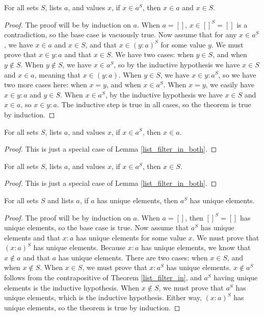 \documentclass[../../math.tex]{subfiles}
\begin{document}
\begin{lemma} \label{list_filter_in_both}
    For all sets $S$, lists $a$, and values $x$, if $x \in a^S$, then $x \in a$
    and $x \in S$.
\end{lemma}
\begin{proof}
    The proof will be by induction on $a$.  When $a = []$, $x \in []^S = []$ is
    a contradiction, so the base case is vacuously true.  Now assume that for
    any $x \in a^S$, we have $x \in a$ and $x \in S$, and that $x \in (y : a)^S$ for some
    value $y$.  We must prove that $x \in y : a$ and that $x \in S$.  We have two cases: when $y
    \in S$, and when $y \notin S$.  When $y \notin S$, we have $x \in a^S$, so
    by the inductive hypothesis we have $x \in S$ and $x \in a$, meaning that $x
    \in (y : a)$.  When $y \in S$, we have $x \in y : a^S$, so we have two more
    cases here: when $x = y$, and when $x \in a^S$.  When $x = y$, we easily
    have $x \in y : a$ and $y \in S$.  When $x \in a^S$, by the inductive
    hypothesis we have $x \in S$ and $x \in a$, so $x \in y : a$.  The inductive
    step is true in all cases, so the theorem is true by induction.
\end{proof}

\begin{theorem} \label{list_filter_in}
    For all sets $S$, lists $a$, and values $x$, if $x \in a^S$, then $x \in a$.
\end{theorem}
\begin{proof}
    This is just a special case of Lemma \ref{list_filter_in_both}.
\end{proof}

\begin{theorem} \label{list_filter_in_set}
    For all sets $S$, lists $a$, and values $x$, if $x \in a^S$, then $x \in S$.
\end{theorem}
\begin{proof}
    This is just a special case of Lemma \ref{list_filter_in_both}.
\end{proof}

\begin{theorem} \label{list_filter_unique}
    For all sets $S$ and lists $a$, if $a$ has unique elements, then $a^S$ has
    unique elements.
\end{theorem}
\begin{proof}
    The proof will be by induction on $a$.  When $a = []$, then $[]^S = []$ has
    unique elements, so the base case is true.  Now assume that $a^S$ has unique
    elements and that $x : a$ has unique elements for some value $x$.  We must
    prove that $(x : a)^S$ has unique elements.  Because $x : a$ has unique
    elements, we know that $x \notin a$ and that $a$ has unique elements.  There
    are two cases: when $x \in S$, and when $x \notin S$.  When $x \in S$, we
    must prove that $x : a^S$ has unique elements.  $x \notin a^S$ follows from
    the contrapositive of Theorem \ref{list_filter_in}, and $a^S$ having unique
    elements is the inductive hypothesis.  When $x \notin S$, we must prove that
    $a^S$ has unique elements, which is the inductive hypothesis.  Either way,
    $(x : a)^S$ has unique elements, so the theorem is true by induction.
\end{proof}
\end{document}
